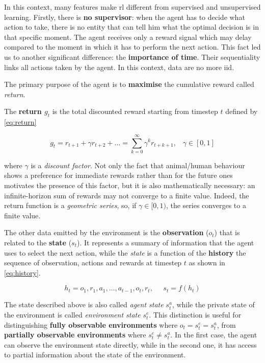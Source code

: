 In this context, many features make \acrshort{rl} different from supervised and unsupervised learning.
Firstly, there is \textbf{no supervisor}: when the agent has to decide what action to take, there is no entity that can tell him what the optimal decision is in that specific moment. The agent receives only a reward signal which may delay compared to the moment in which it has to perform the next action. 
This fact led us to another significant difference: the \textbf{importance of time}. Their sequentiality links all actions taken by the agent. In this context, data are no more \acrfull{iid}.

The primary purpose of the agent is to \textbf{maximise} the cumulative reward called \textit{return}.

The \textbf{return $g_t$} is the total discounted reward starting from timestep $t$ defined by \vref{eq:return}

\begin{equation} \label{eq:return}
	g_t = r_{t+1} + \gamma r_{t+2} + \dots = \sum_{k=0}^{\infty} \gamma^k r_{t+k+1}, \;\;\;\gamma \in [0,1]
\end{equation}

where $\gamma$ is a \textit{discount factor}. Not only the fact that animal/human behaviour shows a preference for immediate rewards rather than for the future ones motivates the presence of this factor, but it is also mathematically necessary: an infinite-horizon sum of rewards may not converge to a finite value. Indeed, the return function is a \textit{geometric series}, so, if $\gamma \in [0,1)$, the series converges to a finite value.


The other data emitted by the environment is the \textbf{observation} ($o_t$) that is related to the \textbf{state} ($s_t$). It represents a summary of information that the agent uses to select the next action, while the \textit{state} is a function of the \textbf{history} the sequence of observation, actions and rewards at timestep $t$ as shown in \vref{eq:history}.

\begin{equation}\label{eq:history}
h_t = o_1, r_1, a_1, \dots, a_{t-1}, o_{t}, r_t, \;\;\;\;\; s_t = f(h_t)
\end{equation}

The state described above is also called \textit{agent state} $s_t^a$, while the private state of the environment is called \textit{environment state} $s_t^e$. This distinction is useful for distinguishing \textbf{fully observable environments} where $o_t = s_t^e = s_t^a$, from \textbf{partially observable environments} where $s_t^e \neq s_t^a$.
In the first case, the agent can observe the environment state directly, while in the second one, it has access to partial information about the state of the environment.

